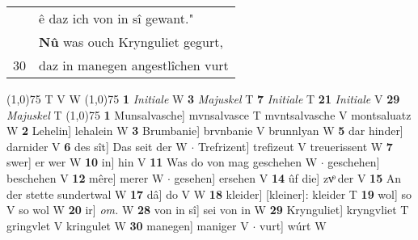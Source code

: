 \documentclass[8pt,a4paper,notitlepage]{article}
\begin{document}
\begin{table}[ht]
\begin{minipage}[t]{0.5\linewidth}
\begin{tabular}{rl}
 & ê daz ich von in sî gewant."\\ 
 & \textbf{Nû} was ouch Krynguliet gegurt,\\ 
30 & daz in manegen angestlîchen vurt\\ 
\end{tabular}
\scriptsize
\line(1,0){75} \newline
T V W \newline
\line(1,0){75} \newline
\textbf{1} \textit{Initiale} W  \textbf{3} \textit{Majuskel} T  \textbf{7} \textit{Initiale} T  \textbf{21} \textit{Initiale} V  \textbf{29} \textit{Majuskel} T  \newline
\line(1,0){75} \newline
\textbf{1} Munsalvasche] mvnsalvasce T mvntsalvasche V montsaluatz W \textbf{2} Lehelin] lehalein W \textbf{3} Brumbanie] brvnbanie V brunnlyan W \textbf{5} dar hinder] darnider V \textbf{6} des sît] Das seit der W  $\cdot$ Trefrizent] trefizeut V treuerissent W \textbf{7} swer] er wer W \textbf{10} in] hin V \textbf{11} Was do von mag geschehen W  $\cdot$ geschehen] beschehen V \textbf{12} mêre] merer W  $\cdot$ gesehen] ersehen V \textbf{14} ûf die] zvͦ der V \textbf{15} An der stette sundertwal W \textbf{17} dâ] do V W \textbf{18} kleider] [kleiner]: kleider T \textbf{19} wol] so V so wol W \textbf{20} ir] \textit{om.} W \textbf{28} von in sî] sei von in W \textbf{29} Krynguliet] kryngvliet T gringvlet V kringulet W \textbf{30} manegen] maniger V  $\cdot$ vurt] wúrt W \newline
\end{minipage}
\end{table}
\end{document}
